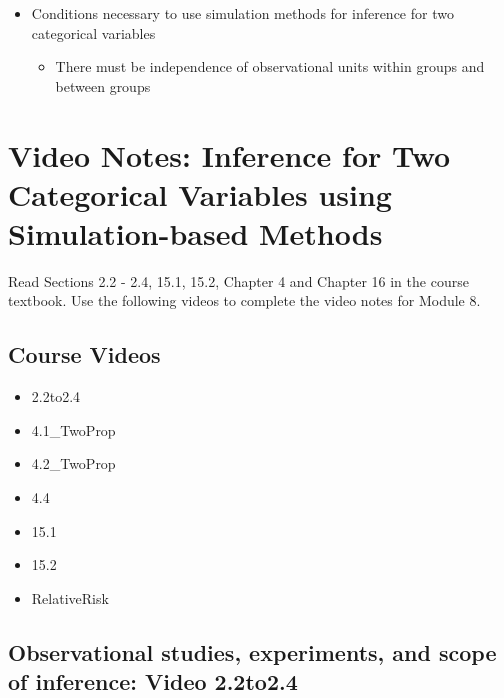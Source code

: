 \documentclass[
]{report}
\providecommand{\tightlist}{%
  \setlength{\itemsep}{0pt}\setlength{\parskip}{0pt}}
\begin{document}
\begin{itemize}
\item
  Conditions necessary to use simulation methods for inference for two categorical variables

  \begin{itemize}
  \tightlist
  \item
    There must be independence of observational units within groups and between groups
  \end{itemize}
\end{itemize}

\newpage

\section{Video Notes: Inference for Two Categorical Variables using Simulation-based Methods}\label{video-notes-inference-for-two-categorical-variables-using-simulation-based-methods}

Read Sections 2.2 - 2.4, 15.1, 15.2, Chapter 4 and Chapter 16 in the course textbook. Use the following videos to complete the video notes for Module 8.

\subsection{Course Videos}\label{course-videos}

\begin{itemize}
\item
  2.2to2.4
\item
  4.1\_TwoProp
\item
  4.2\_TwoProp
\item
  4.4
\item
  15.1
\item
  15.2
\item
  RelativeRisk
\end{itemize}

\subsection*{Observational studies, experiments, and scope of inference: Video 2.2to2.4}\label{observational-studies-experiments-and-scope-of-inference-video-2.2to2.4}
\end{document}
